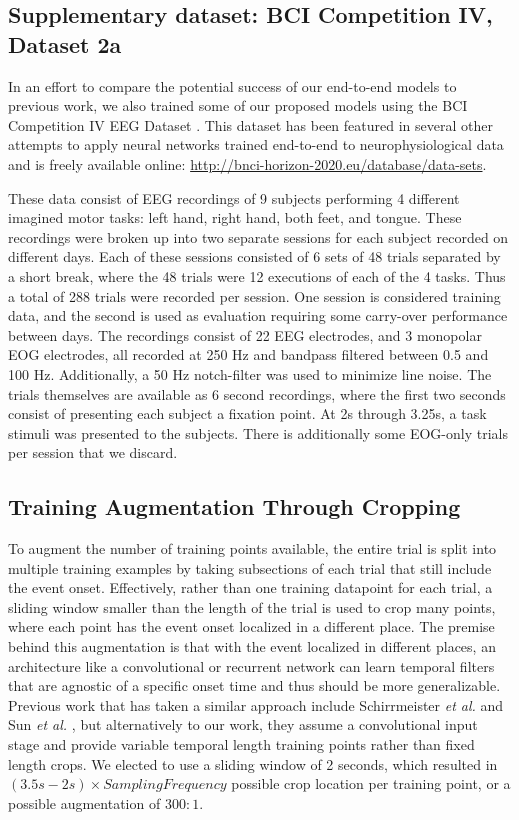 \documentclass[fleqn,10pt]{wlscirep}
\begin{document}
\subsection*{Supplementary dataset: BCI Competition IV, Dataset 2a}

In an effort to compare the potential success of our end-to-end models to previous work, we also trained some of our proposed models using the BCI Competition IV EEG Dataset \cite{Tangermann2012}. This dataset has been featured in several other attempts to apply neural networks trained end-to-end to neurophysiological data \cite{Schirrmeister2017,Tabar2017,Lawhern2017,Sun} and is freely available online: \url{http://bnci-horizon-2020.eu/database/data-sets}.

These data consist of EEG recordings of 9 subjects performing 4 different imagined motor tasks: left hand, right hand, both feet, and tongue. These recordings were broken up into two separate sessions for each subject recorded on different days. Each of these sessions consisted of 6 sets of 48 trials separated by a short break, where the 48 trials were 12 executions of each of the 4 tasks. Thus a total of 288 trials were recorded per session. One session is considered training data, and the second is used as evaluation requiring some carry-over performance between days. The recordings consist of 22 EEG electrodes, and 3 monopolar EOG electrodes, all recorded at 250 Hz and bandpass filtered between 0.5 and 100 Hz. Additionally, a 50 Hz notch-filter was used to minimize line noise. The trials themselves are available as 6 second recordings, where the first two seconds consist of presenting each subject a fixation point. At 2s through 3.25s, a task stimuli was presented to the subjects. There is additionally some EOG-only trials per session that we discard. 

\subsection*{Training Augmentation Through Cropping}

To augment the number of training points available, the entire trial is split into multiple training examples by taking subsections of each trial that still include the event onset. Effectively, rather than one training datapoint for each trial, a sliding window smaller than the length of the trial is used to crop many points, where each point has the event onset localized in a different place. The premise behind this augmentation is that with the event localized in different places, an architecture like a convolutional or recurrent network can learn temporal filters that are agnostic of a specific onset time and thus should be more generalizable. Previous work that has taken a similar approach include Schirrmeister {\em et al.} \cite{Schirrmeister2017} and Sun {\em et al.} \cite{Sun}, but alternatively to our work, they assume a convolutional input stage and provide variable temporal length training points rather than fixed length crops. We elected to use a sliding window of 2 seconds, which resulted in $(3.5s-2s) \times SamplingFrequency$ possible crop location per training point, or a possible augmentation of $300:1$.
\end{document}
